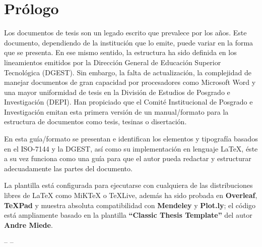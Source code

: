 
\chapter*{Prólogo}

Los documentos de tesis son un legado escrito que prevalece por los años. Este documento, dependiendo de la institución que lo emite, puede variar en la forma que se presenta. En ese mismo sentido, la estructura ha sido definida en los lineamientos emitidos por la Dirección General de Educación Superior Tecnológica (DGEST). Sin embargo, la falta de actualización, la complejidad de manejar documentos de gran capacidad por procesadores como Microsoft Word y una mayor uniformidad de tesis en la División de Estudios de Posgrado e Investigación (DEPI). Han propiciado que el Comité Institucional de Posgrado e Investigación emitan esta primera versión de un manual/formato para la estructura de documentos como tesis, tesinas o disertación.\par 

En esta guía/formato se presentan e identifican los elementos y tipografía basados en el ISO-7144 y la DGEST, así como su implementación en lenguaje \LaTeX, éste a su vez funciona como una guía para que el autor pueda redactar y estructurar adecuadamente las partes del documento.\par

La plantilla está configurada para ejecutarse con cualquiera de las distribuciones libres de \LaTeX{} como MiK\TeX{} o \TeX Live, además ha sido probada en \textbf{Overleaf}, \textbf{\TeX Pad} y muestra absoluta compatibilidad con \textbf{Mendeley} y \textbf{Plot.ly}; el código está ampliamente basado en la plantilla \textbf{``Classic Thesis Template''} del autor \textbf{Andre Miede}.\par 

\bigskip
\begin{flushright}
-- \myName --	
\end{flushright}